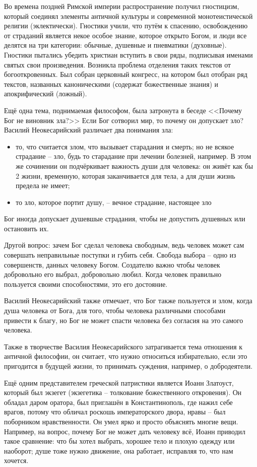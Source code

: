\documentclass[a4paper, 12pt]{book} %
\begin{document}
Во времена поздней Римской империи распространение получил гностицизм, который соединял элементы античной культуры и современной монотеистической религии (эклектически). Гностики учили, что путём к спасению, освобождению от страданий является некое особое знание, которое открыто Богом, и люди все делятся на три категории: обычные, душевные и пневматики (духовные). Гностики пытались убедить христиан вступить в свои ряды, подписывая именами святых свои произведения. Возникла проблема отделения таких текстов от богооткровенных. Был собран церковный конгресс, на котором был отобран ряд текстов, названных каноническими (содержат божественные знания) и апокрифический (ложный).


Ещё одна тема, поднимаемая философом, была затронута в беседе <<Почему Бог не виновник зла?>> Если Бог сотворил мир, то почему он допускает зло? Василий Неокесарийский различает два понимания зла:
\begin{itemize}
\item то, что считается злом, что вызывает старадания и смерть;
но не всякое страдание -- зло, будь то старадание при лечении болезней, например. В этом же сочинении он подчёркивает важность
души для человека: он живёт как бы 2 жизни, временную, которая заканчивается для тела, а для души жизнь предела не имеет;
\item то зло, которое портит душу, -- вечное страдание, настоящее зло
\end{itemize}

Бог иногда допускает душевшые страдания, чтобы не допустить душевных или остановить их.

Другой вопрос: зачем Бог сделал человека свободным, ведь человек может сам совершать неправильные поступки и губить себя. Свобода выбора -- одно из совершенств, данных человеку Богом. Создателю важно чтобы человек добровольно его выбрал, добровольно любил. Когда человек правильно пользуется своими способностями, это его достояние.

Василий Неокесарийский также отмечает, что Бог также пользуется и злом, когда душа человека от Бога, для того, чтобы человека различными способами привести к благу, но Бог не может спасти человека без согласия на это самого человека.

Также в творчестве Василия Неокесарийского затрагивается тема отношения к античной философии, он считает, что нужно относиться избирательно, если это пригодится в будущей жизни, то принимать суждения, например, о добродеятели.

Ещё одним представителем греческой патристики является Иоанн Златоуст, который был экзегет (экзегетика -- толкование божественного откровения). Он обладал даром оратора, был приглашён в Константинополь, где нажил себе врагов, потому что обличал роскошь императорского двора, нравы -- был поборником нравственности. Он умел ярко и просто объяснять многие вещи. Например, на вопрос, почему Бог не может дать человеку всё, Иоанн приводил такое сравнение: что бы хотел выбрать, хорошее тело и плохую одежду или наоборот; душе тоже нужно движение, она работает, исправляя то, что нам хочется.
\end{document}

